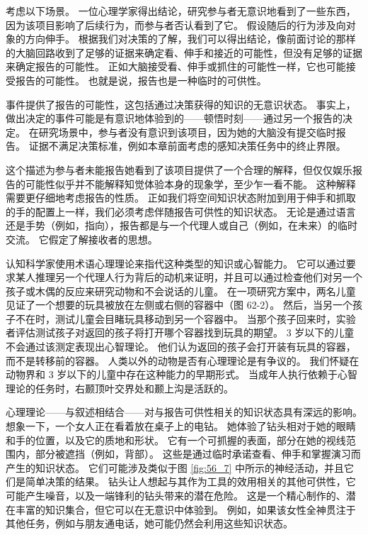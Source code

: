 考虑以下场景。
一位心理学家得出结论，研究参与者无意识地看到了一些东西，因为该项目影响了后续行为，而参与者否认看到了它。
假设随后的行为涉及向对象的方向伸手。
根据我们对决策的了解，我们可以得出结论，像前面讨论的那样的大脑回路收到了足够的证据来确定看、伸手和接近的可能性，但没有足够的证据来确定报告的可能性。
正如大脑接受看、伸手或抓住的可能性一样，它也可能接受报告的可能性。
也就是说，报告也是一种临时的可供性。


事件提供了报告的可能性，这包括通过决策获得的知识的无意识状态。
事实上，做出决定的事件可能是有意识地体验到的——顿悟时刻——通过另一个报告的决定。
在研究场景中，参与者没有意识到该项目，因为她的大脑没有提交临时报告。
证据不满足决策标准，例如本章前面考虑的感知决策任务中的终止界限。


这个描述为参与者未能报告她看到了该项目提供了一个合理的解释，但仅仅娱乐报告的可能性似乎并不能解释知觉体验本身的现象学，至少乍一看不能。
这种解释需要更仔细地考虑报告的性质。
正如我们将空间知识状态附加到用于伸手和抓取的手的配置上一样，我们必须考虑伴随报告可供性的知识状态。
无论是通过语言还是手势（例如，指向），报告都是与一个代理人或自己（例如，在未来）的临时交流。
它假定了解接收者的思想。


认知科学家使用术语心理理论来指代这种类型的知识或心智能力。
它可以通过要求某人推理另一个代理人行为背后的动机来证明，并且可以通过检查他们对另一个孩子或木偶的反应来研究动物和不会说话的儿童。
在一项研究方案中，两名儿童见证了一个想要的玩具被放在左侧或右侧的容器中（图 62-2）。
然后，当另一个孩子不在时，测试儿童会目睹玩具移动到另一个容器中。
当那个孩子回来时，实验者评估测试孩子对返回的孩子将打开哪个容器找到玩具的期望。
3 岁以下的儿童不会通过该测定表现出心智理论。
他们认为返回的孩子会打开装有玩具的容器，而不是转移前的容器。
人类以外的动物是否有心理理论是有争议的。
我们怀疑在动物界和 3 岁以下的儿童中存在这种能力的早期形式。
当成年人执行依赖于心智理论的任务时，右颞顶叶交界处和颞上沟是活跃的。


心理理论——与叙述相结合——对与报告可供性相关的知识状态具有深远的影响。
想象一下，一个女人正在看着放在桌子上的电钻。
她体验了钻头相对于她的眼睛和手的位置，以及它的质地和形状。
它有一个可抓握的表面，部分在她的视线范围内，部分被遮挡（例如，背部）。
这些是通过临时承诺查看、伸手和掌握演习而产生的知识状态。
它们可能涉及类似于图 \ref{fig:56_7} 中所示的神经活动，并且它们是简单决策的结果。
钻头让人想起与其作为工具的效用相关的其他可供性，它可能产生噪音，以及一端锋利的钻头带来的潜在危险。
这是一个精心制作的、潜在丰富的知识集合，但它可以在无意识中体验到。
例如，如果该女性全神贯注于其他任务，例如与朋友通电话，她可能仍然会利用这些知识状态。


